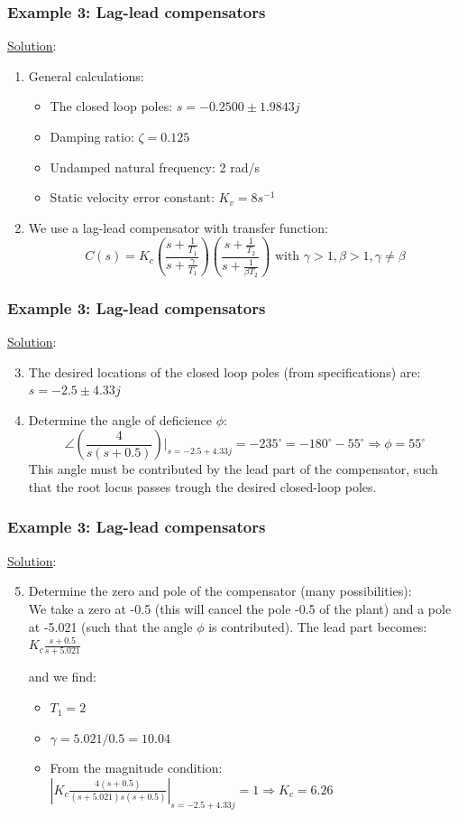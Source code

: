 \begin{frame}
	\frametitle{Example 3: Lag-lead compensators}
	\underline{Solution}:
	\begin{enumerate}
		\item General calculations:
		\begin{itemize}
			\item The closed loop poles: $s=-0.2500\pm1.9843j$
			\item Damping ratio: $\zeta=0.125$
			\item Undamped natural frequency: 2 rad/s
			\item Static velocity error constant: $K_v=8s^{-1}$
		\end{itemize}
	\item We use a lag-lead compensator with transfer function:
	$$C(s)=K_c(\frac{s+\frac{1}{T_1}}{s+\frac{\gamma}{T_1}})(\frac{s+\frac{1}{T_2}}{s+\frac{1}{\beta T_2}}) \text{ with } \gamma>1, \beta>1, \gamma\neq\beta$$
	\end{enumerate}
\end{frame}

\begin{frame}
	\frametitle{Example 3: Lag-lead compensators}
	\underline{Solution}:
	\begin{enumerate}
		\setcounter{enumi}{2}
		\item The desired locations of the closed loop poles (from specifications) are: $s=-2.5\pm4.33j$
		\item Determine the angle of deficience $\phi$:
		$$\angle(\frac{4}{s(s+0.5)})|_{s=-2.5+4.33j}=-235^{\circ}=-180^{\circ}-55^{\circ} \Rightarrow \phi=55^{\circ}$$
		This angle must be contributed by the lead part of the compensator, such that the root locus passes trough the desired closed-loop poles. 
	\end{enumerate}
\end{frame}

\begin{frame}
	\frametitle{Example 3: Lag-lead compensators}
	\underline{Solution}:
	\begin{enumerate}
		\setcounter{enumi}{4}
		\item Determine the zero and pole of the compensator (many possibilities):\\
		We take a zero at -0.5 (this will cancel the pole -0.5 of the plant) and a pole at -5.021 (such that the angle $\phi$ is contributed).
		The lead part becomes:\\
		$K_c\frac{s+0.5}{s+5.021}$\vspace{3mm}
		
		and we find:
		\begin{itemize}
			\item $T_1=2$
			\item $\gamma=5.021/0.5=10.04$
			\item From the magnitude condition: \\
			$|K_c\frac{4(s+0.5)}{(s+5.021)s(s+0.5)}|_{s=-2.5+4.33j}=1 \Rightarrow K_c=6.26$
		\end{itemize}
	\end{enumerate}
\end{frame}


